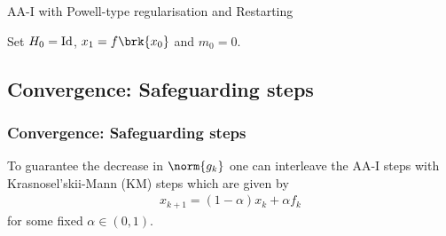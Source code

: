 \begin{frame}
	\begin{algorithm}[H]
	\caption{AA-I with Powell-type regularisation and Restarting}\label{alg:aa1-pr-Hk}
	\color{gray}
	\BlankLine
	Set $H_0=\operatorname{Id}$, $x_1=f\brk{x_0}$ and {\black $m_0 = 0$}.
	
	\end{algorithm}
\end{frame}

\subsection{Convergence: Safeguarding steps}
\begin{frame}
	\frametitle{Convergence: Safeguarding steps}
	To guarantee the decrease in $\norm{g_k}$ one can interleave the AA-I steps with Krasnosel'skii-Mann (KM) steps which are given by
	\begin{align*}
		x_{k+1}= (1-\alpha)x_k +\alpha f_k
	\end{align*}
	for some fixed $\alpha\in(0,1)$.
\end{frame}

\SetAlFnt{\scriptsize}

